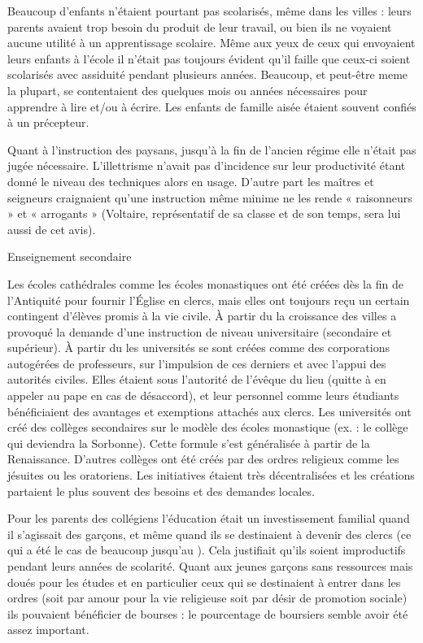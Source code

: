 Beaucoup d'enfants n'étaient pourtant pas scolarisés, même dans les villes : leurs parents avaient trop besoin du produit de leur travail, ou bien ils ne voyaient aucune utilité à un apprentissage scolaire. Même aux yeux de ceux qui envoyaient leurs enfants à l'école il n'était pas toujours évident qu'il faille que ceux-ci soient scolarisés avec assiduité pendant plusieurs années. Beaucoup, et peut-être meme la plupart, se contentaient des quelques mois ou années nécessaires pour apprendre à lire et/ou à écrire. Les enfants de famille aisée étaient souvent confiés à un précepteur.  

 Quant à l'instruction des paysans, jusqu'à la fin de l'ancien régime elle n'était pas jugée nécessaire. L'illettrisme n'avait pas d'incidence sur leur productivité étant donné le niveau des techniques alors en usage. D'autre part les maîtres et seigneurs craignaient qu'une instruction même minime ne les rende « raisonneurs » et « arrogants » (Voltaire, représentatif de sa classe et de son temps, sera lui aussi de cet avis).

Enseignement secondaire 

Les écoles cathédrales comme les écoles monastiques ont été créées dès la fin de l'Antiquité pour fournir l'Église en clercs, mais elles ont toujours reçu un certain contingent d'élèves promis à la vie civile. À partir du  la croissance des villes a provoqué la demande d'une instruction de niveau universitaire (secondaire et supérieur). À partir du  les universités se sont créées comme des corporations autogérées de professeurs, sur l'impulsion de ces derniers et avec l'appui des autorités civiles. Elles étaient sous l'autorité de l'évêque du lieu (quitte à en appeler au pape en cas de désaccord), et leur personnel comme leurs étudiants bénéficiaient des avantages et exemptions attachés aux clercs. Les universités ont créé des collèges secondaires sur le modèle des écoles monastique (ex. : le collège qui deviendra la Sorbonne). Cette formule s'est généralisée à partir de la Renaissance. D'autres collèges ont été créés par des ordres religieux comme les jésuites ou les oratoriens. Les initiatives étaient très décentralisées et les créations partaient le plus souvent des besoins et des demandes locales. 
 
 Pour les parents des collégiens l'éducation était un investissement familial quand il s'agissait des garçons, et même quand ils se destinaient à devenir des clercs (ce qui a été le cas de beaucoup jusqu'au ). Cela justifiait qu'ils soient improductifs pendant leurs années de scolarité. Quant aux jeunes garçons sans ressources mais doués pour les études et en particulier ceux qui se destinaient à entrer dans les ordres (soit par amour pour la vie religieuse soit par désir de promotion sociale) ils pouvaient bénéficier de bourses : le pourcentage de boursiers semble avoir été assez important.


